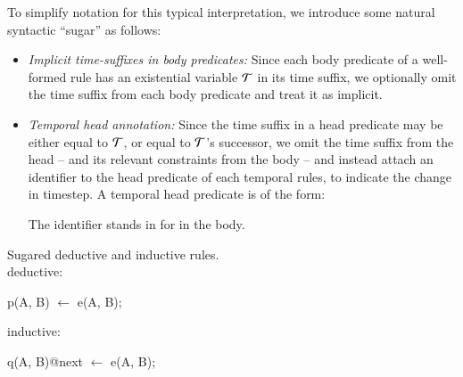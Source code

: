 To simplify \slang notation for this typical interpretation,  we introduce
some natural syntactic ``sugar'' as follows:

\begin{itemize}
%
%
\item {\em Implicit time-suffixes in body predicates:} Since each body
predicate of a well-formed rule has an existential variable $\Tau$ in its
time suffix, we optionally omit the time suffix from each body predicate and treat
it as implicit.
%
\item {\em Temporal head annotation:} Since the time suffix in a head predicate
may be either equal to $\Tau$, or equal to $\Tau$'s successor, we omit the time
suffix from the head -- and its relevant constraints from the body -- and
instead attach an identifier to the head predicate of each temporal rules, to indicate the change in
timestep.  A temporal head predicate is of the form:


The identifier  stands in for  in
the body.

%
%
%
%
%
\end{itemize}


\begin{example}
Sugared deductive and inductive rules.
\\
deductive:
\begin{Dedalus}
p(A, B) \(\leftarrow\) e(A, B);
\end{Dedalus}
inductive:
\begin{Dedalus}
q(A, B)@next \(\leftarrow\) e(A, B);
\end{Dedalus}
\end{example}


